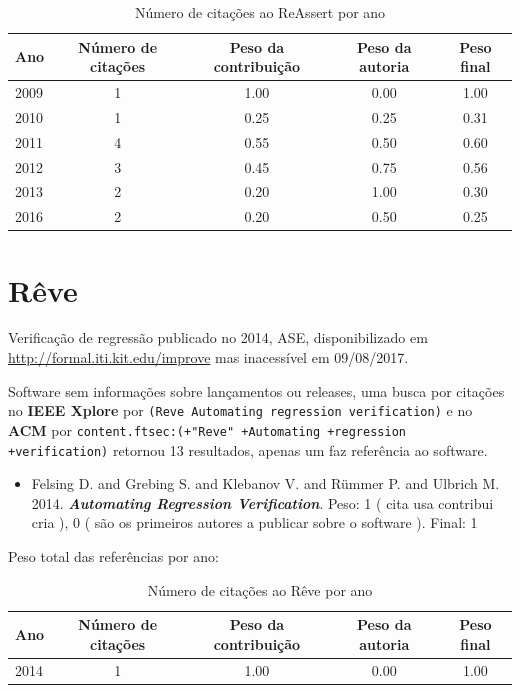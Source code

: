 \begin{table}[h]
\caption{Número de citações ao ReAssert por ano}
\centering
\begin{tabular}{| l | c | c | c | c |}
  \hline
  Ano & Número de citações & Peso da contribuição & Peso da autoria & Peso final \\
  \hline
  2009
    & 1
    & 1.00
    & 0.00
    & 1.00 \\
  2010
    & 1
    & 0.25
    & 0.25
    & 0.31 \\
  2011
    & 4
    & 0.55
    & 0.50
    & 0.60 \\
  2012
    & 3
    & 0.45
    & 0.75
    & 0.56 \\
  2013
    & 2
    & 0.20
    & 1.00
    & 0.30 \\
  2016
    & 2
    & 0.20
    & 0.50
    & 0.25 \\
  \hline
\end{tabular}
\end{table}


\section{Rêve}

Verificação de regressão
publicado no 2014, ASE,
disponibilizado em \url{http://formal.iti.kit.edu/improve}
mas inacessível em 09/08/2017.

Software sem informações sobre lançamentos ou releases,
uma busca por citações no {\bf IEEE Xplore} por
\texttt{(Reve Automating regression verification)}
e no {\bf ACM} por
\texttt{content.ftsec:(+"Reve" +Automating +regression +verification)}
retornou
13 resultados,
apenas um faz referência ao software.

\begin{itemize}
\item Felsing D. and Grebing S. and Klebanov V. and R\"{u}mmer P. and Ulbrich M.
      2014.
        \textbf{\textit{ Automating Regression Verification}}.
      Peso:
      1 (
          cita
          usa
          contribui
          cria
      ),
      0 (
são os primeiros autores a publicar sobre o software
      ).
      Final:
      1

\end{itemize}

Peso total das referências por ano:

\begin{table}[h]
\caption{Número de citações ao Rêve por ano}
\centering
\begin{tabular}{| l | c | c | c | c |}
  \hline
  Ano & Número de citações & Peso da contribuição & Peso da autoria & Peso final \\
  \hline
  2014
    & 1
    & 1.00
    & 0.00
    & 1.00 \\
  \hline
\end{tabular}
\end{table}


